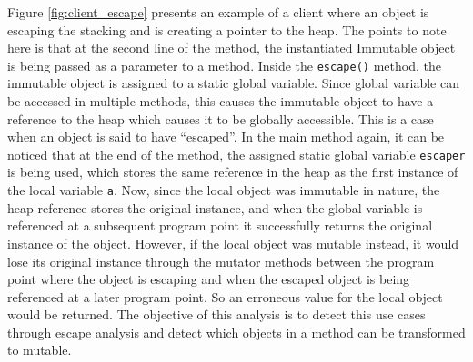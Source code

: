 Figure \ref{fig:client_escape} presents an example of a client where an object is escaping the stacking and is creating a pointer to the heap. The points to note here is that at the second line of the method, the instantiated Immutable object is being passed as a parameter to a method. Inside the \texttt{escape()} method, the immutable object is assigned to a static global variable. Since global variable can be accessed in multiple methods, this causes the immutable object to have a reference to the heap which causes it to be globally accessible. This is a case when an object is said to have ``escaped''. In the main method again, it can be noticed that at the end of the method, the assigned static global variable \texttt{escaper} is being used, which stores the same reference in the heap as the first instance of the local variable \texttt{a}. Now, since the local object was immutable in nature, the heap reference stores the original instance, and when the global variable is referenced at a subsequent program point it successfully returns the original instance of the object. However, if the local object was mutable instead, it would lose its original instance through the mutator methods between the program point where  the object is escaping and when the escaped object is being referenced at a later program point. So an erroneous value for the local object would be returned. The objective of this analysis is to detect this use cases through escape analysis and detect which objects in a method can be transformed to mutable.
